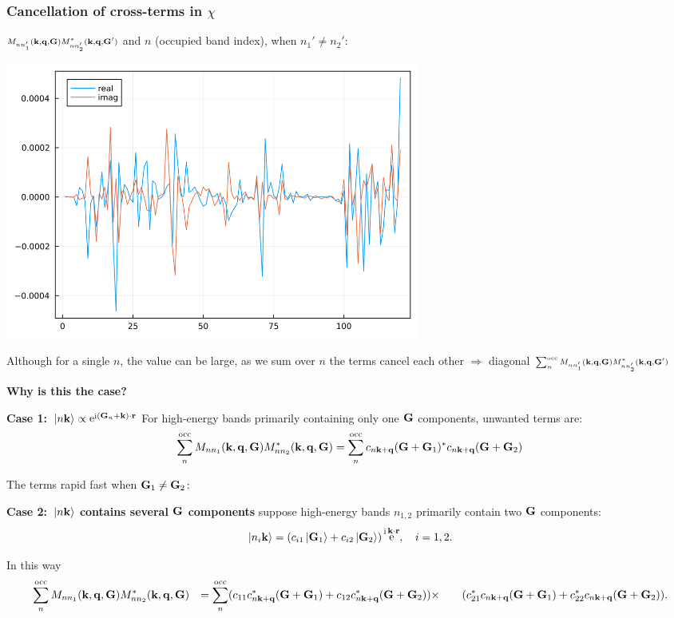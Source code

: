 \documentclass[t]{beamer}
\DeclareMathOperator{\ee}{e}
\DeclareMathOperator{\ii}{i}
\def\\{}%
\begin{document}
\begin{frame}[allowframebreaks]
\frametitle{Cancellation of cross-terms in $\chi$}

$\scriptstyle M_{n n'_1} (\vb{k}, \vb{q}, \vb{G}) M^*_{nn'_2} (\vb{k}, \vb{q}, \vb{G}')$ and $n$ (occupied band index), when $n_1' \neq n_2'$:
\begin{center}
    \includegraphics[width=0.6\textwidth]{../data/chi/nc-n1-2000-n2-1000-nv-1-120-k_idx-12-q_idx-37-G_idx-200.png}
\end{center}

\faHandPointRight Although for a single $n$, the value can be large, 
as we sum over $n$ the terms cancel each other $\Rightarrow$
diagonal $\scriptstyle \sum_{n}^{\text{occ}} M_{n n'_1} (\vb{k}, \vb{q}, \vb{G}) M^*_{nn'_2} (\vb{k}, \vb{q}, \vb{G}')$

\textbf{Why is this the case?}

\textbf{Case 1: $\ket*{n \vb{k}} \propto \ee^{\ii (\vb{G}_n + \vb{k}) \cdot \vb{r}}$} For high-energy bands primarily containing only one $\vb{G}$ components, 
unwanted terms are:
\[
    \sum_n^{\text{occ}} M_{n n_1} (\vb{k}, \vb{q}, \vb{G}) M^*_{nn_2} (\vb{k}, \vb{q}, \vb{G})
    = \sum_n^{\text{occ}} c_{n \vb{k}+\vb{q}}(\vb{G} + \vb{G}_1)^* c_{n \vb{k} + \vb{q}}(\vb{G} + \vb{G}_2)
\]

The terms rapid fast when $\vb{G}_1 \neq \vb{G}_2$:

\framebreak

\textbf{Case 2: $\ket*{n \vb{k}}$ contains several $\vb{G}$ components} suppose high-energy bands $n_{1, 2}$ primarily contain two $\vb{G}$ components:
\begin{equation}
    \ket*{n_{i} \vb{k}} = (c_{i1} \ket*{\vb{G}_1} + c_{i2} \ket*{\vb{G}_2})  \ee^{\ii \vb{k} \cdot \vb{r}}, \quad i = 1, 2.
\end{equation}

In this way 
\[
    \begin{aligned}
        &\quad \sum_n^{\text{occ}} M_{n n_1} (\vb{k}, \vb{q}, \vb{G}) M^*_{nn_2} (\vb{k}, \vb{q}, \vb{G}) \\
        &= \sum_n^{\text{occ}} (c_{11} c_{n \vb{k} + \vb{q}}^*(\vb{G} + \vb{G}_1) 
        + c_{12} c_{n \vb{k} + \vb{q}}^*(\vb{G} + \vb{G}_2) ) \times \\
         &\quad \quad (c_{21}^* c_{n \vb{k} + \vb{q}}(\vb{G} + \vb{G}_1) 
         + c_{22}^* c_{n \vb{k} + \vb{q}}(\vb{G} + \vb{G}_2)).
    \end{aligned}
\]


\end{frame}
\end{document}
